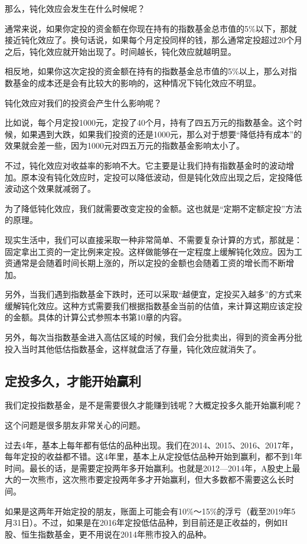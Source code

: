 那么，钝化效应会发生在什么时候呢？

通常来说，如果你定投的资金额在你现在持有的指数基金总市值的5\%以下，那就接近钝化效应了。换句话说，如果每个月定投同样的钱，那么通常定投超过20个月之后，钝化效应就开始出现了。时间越长，钝化效应就越明显。

相反地，如果你这次定投的资金额在持有的指数基金总市值的5\%以上，那么对指数基金的成本还是会有比较大的影响的，这种情况下钝化效应不明显。

钝化效应对我们的投资会产生什么影响呢？

比如说，每个月定投1000元，定投了40个月，持有了四五万元的指数基金。这个时候，如果遇到大跌，如果我们投资的还是1000元，那么对于想要“降低持有成本”的效果就会差一些，因为1000元对四五万元的指数基金影响太小了。

不过，钝化效应对收益率的影响不大。它主要是让我们持有指数基金时的波动增加。原本没有钝化效应时，定投可以降低波动，但是钝化效应出现之后，定投降低波动这个效果就减弱了。

为了降低钝化效应，我们就需要改变定投的金额。这也就是“定期不定额定投”方法的原理。

现实生活中，我们可以直接采取一种非常简单、不需要复杂计算的方式，那就是：固定拿出工资的一定比例来定投。这样做能够在一定程度上缓解钝化效应。因为工资通常是会随着时间长期上涨的，所以定投的金额也会随着工资的增长而不断增加。

另外，当我们遇到指数基金下跌时，还可以采取“越便宜，定投买入越多”的方式来缓解钝化效应。这种方式需要我们根据指数基金当前的估值，来计算这期应该定投的金额。具体的计算公式参照本书第10章的内容。

另外，每次当指数基金进入高估区域的时候，我们会分批卖出，得到的资金再分批投入当时其他低估指数基金，这样就盘活了存量，钝化效应就消失了。

\subsection{定投多久，才能开始赢利}
{\kaishu 我们定投指数基金，是不是需要很久才能赚到钱呢？大概定投多久能开始赢利呢？}

这个问题是很多朋友非常关心的问题。

过去4年，基本上每年都有低估的品种出现。我们在2014、2015、2016、2017年，每年定投的收益都不错。这4年里，基本上从定投低估品种开始到赢利，都不到1年时间。最长的话，是需要定投两年多开始赢利。也就是2012—2014年，A股史上最大的一次熊市，这次熊市要定投两年多才开始赢利，但大多数都不需要这么长时间。

如果是这两年开始定投的朋友，账面上可能会有10\%～15\%的浮亏（截至2019年5月31日）。不过，如果是在2016年定投低估品种，到目前还是正收益的，例如H股、恒生指数基金，更不用说在2014年熊市投入的品种。


